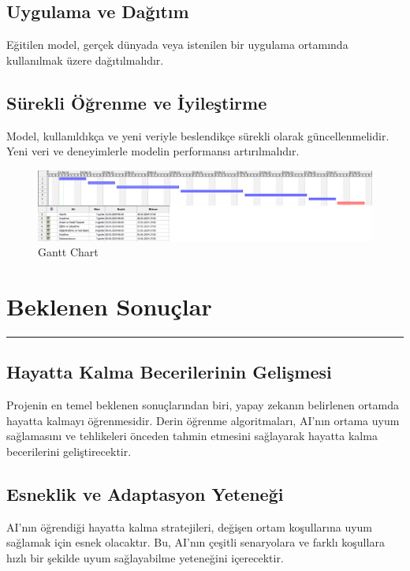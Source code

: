 \documentclass{article}
\begin{document}
\subsection{Uygulama ve Dağıtım}
Eğitilen model, gerçek dünyada veya istenilen bir uygulama ortamında kullanılmak üzere dağıtılmalıdır.
\subsection{Sürekli Öğrenme ve İyileştirme}
Model, kullanıldıkça ve yeni veriyle beslendikçe sürekli olarak güncellenmelidir. Yeni veri ve deneyimlerle modelin performansı artırılmalıdır.
\newpage
\begin{landscape}
\thispagestyle{empty} %
    \begin{figure}
     \centering
  \includegraphics[angle=360,width=1.6\textwidth]{ganchartt.png}\centering %
  \caption{Gantt Chart}
  \label{fig:resim_etiketi}
\end{figure}
\end{landscape}

\clearpage

\section{Beklenen Sonuçlar}
\rule{\textwidth}{0.5pt}
\subsection{Hayatta Kalma Becerilerinin Gelişmesi}
Projenin en temel beklenen sonuçlarından biri, yapay zekanın belirlenen ortamda hayatta kalmayı öğrenmesidir. Derin öğrenme algoritmaları, AI'nın ortama uyum sağlamasını ve tehlikeleri önceden tahmin etmesini sağlayarak hayatta kalma becerilerini geliştirecektir.
\subsection{Esneklik ve Adaptasyon Yeteneği}
AI'nın öğrendiği hayatta kalma stratejileri, değişen ortam koşullarına uyum sağlamak için esnek olacaktır. Bu, AI'nın çeşitli senaryolara ve farklı koşullara hızlı bir şekilde uyum sağlayabilme yeteneğini içerecektir.
\end{document}
